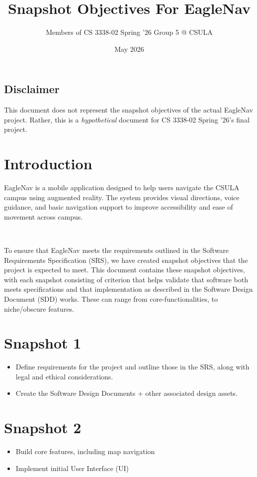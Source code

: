 \documentclass{article}
\title{Snapshot Objectives For EagleNav}
\author{Members of CS 3338-02 Spring '26 Group 5 @ CSULA}
\date{May 2026}
\begin{document}
\maketitle
\subsection{Disclaimer}
This document does not represent the snapshot objectives of the actual EagleNav project. Rather, this is a \textit{hypothetical} document for CS 3338-02 Spring '26's final project.

\section{Introduction}
EagleNav is a mobile application designed to help users navigate the CSULA campus using augmented reality. The system provides visual directions, voice guidance, and basic navigation support to improve accessibility and ease of movement across campus.

\

To ensure that EagleNav meets the requirements outlined in the Software Requirements Specification (SRS), we have created snapshot objectives that the project is expected to meet. This document contains these snapshot objectives, with each snapshot consisting of criterion that helps validate that software both meets specifications and that implementation as described in the Software Design Document (SDD) works. These can range from core-functionalities, to niche/obscure features.

\section{Snapshot 1}
\begin{itemize}
\item Define requirements for the project and outline those in the SRS, along with legal and ethical considerations.
\item Create the Software Design Documents + other associated design assets.
\end{itemize}

\section{Snapshot 2}
\begin{itemize}
\item Build core features, including map navigation
\item Implement initial User Interface (UI)
\end{itemize}
\end{document}
